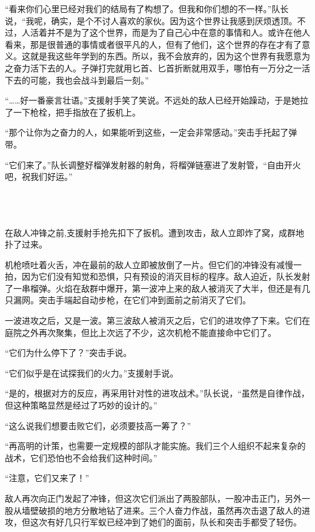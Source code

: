 “看来你们心里已经对我们的结局有了构想了。但我和你们想的不一样。”队长说，“我呢，确实，是个不讨人喜欢的家伙。因为这个世界让我感到厌烦透顶。不过，人活着并不是为了这个世界，而是为了自己心中在意的事情和人。或许在他人看来，那是很普通的事情或者很平凡的人，但有了他们，这个世界的存在才有了意义。这就是我这些年学到的东西。所以，我不会放弃的，因为这个世界有我愿意为之奋力活下去的人。子弹打完就用匕首、匕首折断就用双手，哪怕有一万分之一活下去的可能，我也会战斗到最后一刻。”

“……好一番豪言壮语。”支援射手笑了笑说。不远处的敌人已经开始躁动，于是她拉了一下枪栓，把手指放在了扳机上。

“那个让你为之奋力的人，如果能听到这些，一定会非常感动。”突击手托起了弹带。

“它们来了。”队长调整好榴弹发射器的射角，将榴弹链塞进了发射管，“自由开火吧，祝我们好运。”



 \section*{}

在敌人冲锋之前,支援射手抢先扣下了扳机。遭到攻击，敌人立即炸了窝，成群地扑了过来。

机枪喷吐着火舌，冲在最前的敌人立即被放倒了一片。但它们的冲锋没有减慢一拍，因为它们没有知觉和恐惧，只有预设的消灭目标的程序。敌人迫近，队长发射了一串榴弹。火焰在敌群中爆开，第一波冲上来的敌人被消灭了大半，但还是有几只漏网。突击手端起自动步枪，在它们冲到面前之前消灭了它们。

一波进攻之后，又是一波。第三波敌人被消灭之后，它们的进攻停了下来。它们在庭院之外再次聚集，但比上次远了不少，这次机枪不能直接命中它们了。

“它们为什么停下了？”突击手说。

“它们似乎是在试探我们的火力。”支援射手说。

“是的，根据对方的反应，再采用针对性的进攻战术。”队长说，“虽然是自律作战，但这种策略显然是经过了巧妙的设计的。”

“这么说我们想要击败它们，必须要技高一筹了？”

“再高明的计策，也需要一定规模的部队才能实施。我们三个人组织不起来复杂的战术，它们恐怕也不会给我们这种时间。”

“注意，它们又来了！”

敌人再次向正门发起了冲锋，但这次它们派出了两股部队，一股冲击正门，另外一股从墙壁破损的地方分散地钻了进来。三个人奋力作战，虽然再次击退了敌人的进攻，但这次有好几只行军蚁已经冲到了她们的面前，队长和突击手都受了轻伤。

